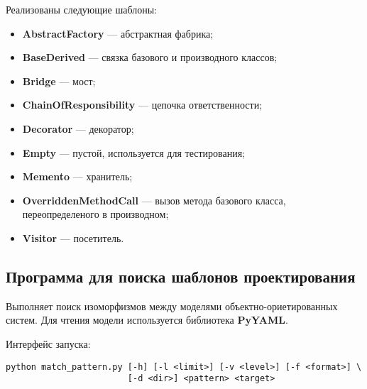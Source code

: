 Реализованы следующие шаблоны:
\begin{itemize}
\item \textbf{AbstractFactory} --- абстрактная фабрика;
\item \textbf{BaseDerived} --- связка базового и производного классов;
\item \textbf{Bridge} --- мост;
\item \textbf{ChainOfResponsibility} --- цепочка ответственности;
\item \textbf{Decorator} --- декоратор;
\item \textbf{Empty} --- пустой, используется для тестирования;
\item \textbf{Memento} --- хранитель;
\item \textbf{OverriddenMethodCall} --- вызов метода базового класса,
переопределеного в производном;
\item \textbf{Visitor} --- посетитель.
\end{itemize}

\subsection{Программа для поиска шаблонов проектирования}

Выполняет поиск изоморфизмов между моделями объектно-ориетированных систем.
Для чтения модели используется библиотека \textbf{PyYAML}.

Интерфейс запуска:
\begin{verbatim}
python match_pattern.py [-h] [-l <limit>] [-v <level>] [-f <format>] \
                        [-d <dir>] <pattern> <target>
\end{verbatim}


